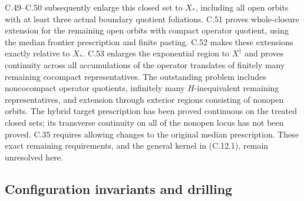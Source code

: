 C.49--C.50 subsequently enlarge this closed set to $X_*$,
including all open orbits with at least three actual boundary
quotient foliations. C.51 proves whole-closure extension for
the remaining open orbits with compact operator quotient,
using the median frontier prescription and finite pasting.
C.52 makes these extensions exactly relative to $X_*$.
C.53 enlarges the exponential region to $X^\dagger$ and
proves continuity across all accumulations of the operator
translates of finitely many remaining cocompact representatives.
The outstanding problem includes noncocompact operator
quotients, infinitely many $H$-inequivalent remaining
representatives, and extension through exterior regions
consisting of nonopen orbits. The hybrid target prescription
has been proved continuous on the treated closed sets;
its transverse continuity on all of the nonopen locus has
not been proved. C.35 requires allowing changes to the
original median prescription. These exact remaining
requirements, and the general kernel in (C.12.1), remain
unresolved here.


\subsection{Configuration invariants and drilling}

